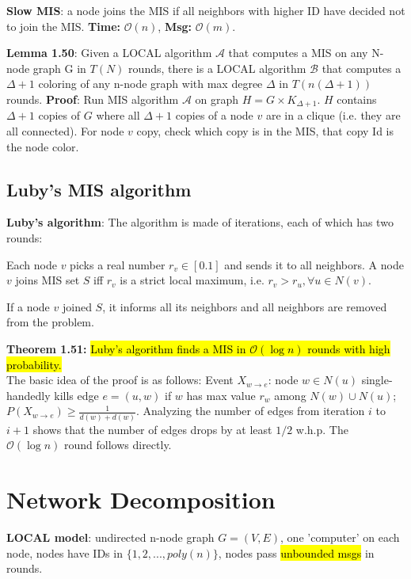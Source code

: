 \documentclass[a4paper, 8pt, landscape]{scrartcl}
\begin{document}
\begin{multicols*}{3}
\textbf{Slow MIS}: a node joins the MIS if all neighbors with higher ID have decided not to join the MIS. \textbf{Time:} $\mathcal{O}(n)$, \textbf{Msg:} $\mathcal{O}(m)$.

\textbf{Lemma 1.50}: Given a LOCAL algorithm $\mathcal{A}$ that computes a MIS on any N-node graph G in $T(N)$ rounds, there is a LOCAL algorithm $\mathcal{B}$ that computes a $\Delta+1$ coloring of any n-node graph with max degree $\Delta$ in $T(n(\Delta+1))$ rounds.
\textbf{Proof}: Run MIS algorithm $\mathcal{A}$ on graph $H = G \times K_{\Delta+1}$. $H$ contains $\Delta+1$ copies of $G$ where all $\Delta+1$ copies of a node $v$ are in a clique (i.e. they are all connected). For node $v$ copy, check which copy is in the MIS, that copy Id is the node color.

\subsection{Luby's MIS algorithm}

\textbf{Luby's algorithm}: The algorithm is made of iterations, each of which has two rounds:

\begin{compactenum}
\item Each node $v$ picks a real number $r_v \in [0.1]$ and sends it to all neighbors. A node $v$ joins MIS set $S$ iff $r_v$ is a strict local maximum, i.e. $r_v > r_u, \forall u \in N(v)$.

\item If a node $v$ joined $S$, it informs all its neighbors and all neighbors are removed from the problem.
\end{compactenum}

\textbf{Theorem 1.51:} \hl{Luby's algorithm finds a MIS in $\mathcal{O}(\log n)$ rounds with high probability.}\\
The basic idea of the proof is as follows: Event $X_{w\rightarrow e}$: node $w \in N(u)$ single-handedly kills edge $e=(u,w)$ if $w$ has max value $r_w$ among $N(w) \cup N(u)$; $P(X_{w\rightarrow e}) \geq \frac{1}{d(w)+d(w)}$. Analyzing the number of edges from iteration $i$ to $i+1$ shows that the number of edges drops by at least $1/2$ w.h.p. The $\mathcal{O}(\log n)$ round follows directly.


\section{Network Decomposition}

\textbf{LOCAL model}: undirected n-node graph $G=(V,E)$, one 'computer' on each node, nodes have IDs in $\{1,2,..., poly(n)\}$, nodes pass \hl{unbounded msgs} in rounds.


\end{multicols*}
\end{document}
